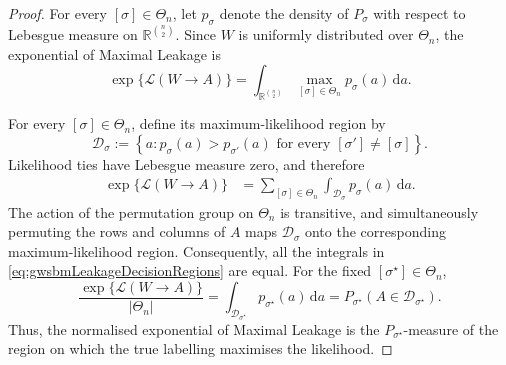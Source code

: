 \documentclass[11pt]{article}
\theoremstyle{definition}
\theoremstyle{remark}
\newcommand{\1}{\boldsymbol{1}}
\newcommand{\ml}[2]{\mathcal{L}(#1\!\to\!#2)}
\begin{document}
\begin{proof}
For every $[\sigma]\in\Theta_n$, let $p_\sigma$ denote the density of
$P_\sigma$ with respect to Lebesgue measure on
$\mathbb R^{\binom{n}{2}}$. Since $W$ is uniformly distributed over
$\Theta_n$, the exponential of Maximal Leakage is
\begin{equation}
\exp\{\ml{W}{A}\}
=
\int_{\mathbb R^{\binom{n}{2}}}
\max_{[\sigma]\in\Theta_n}
p_\sigma(a)
\,\mathrm da.
\label{eq:gwsbmLeakageIntegral}
\end{equation}

For every $[\sigma]\in\Theta_n$, define its maximum-likelihood region by
\begin{equation}
\mathcal D_\sigma
:=
\left\{
a:
p_\sigma(a)>
p_{\sigma'}(a)
\text{ for every }
[\sigma']\neq[\sigma]
\right\}.
\label{eq:gwsbmMLRegion}
\end{equation}
Likelihood ties have Lebesgue measure zero, and therefore
\begin{align}
\exp\{\ml{W}{A}\}
&=
\sum_{[\sigma]\in\Theta_n}
\int_{\mathcal D_\sigma}
p_\sigma(a)
\,\mathrm da.
\label{eq:gwsbmLeakageDecisionRegions}
\end{align}
The action of the permutation group on $\Theta_n$ is transitive, and
simultaneously permuting the rows and columns of $A$ maps
$\mathcal D_\sigma$ onto the corresponding maximum-likelihood region.
Consequently, all the integrals in
\eqref{eq:gwsbmLeakageDecisionRegions} are equal. For the fixed
$[\sigma^\star]\in\Theta_n$,
\begin{equation}
\frac{\exp\{\ml{W}{A}\}}{|\Theta_n|}
=
\int_{\mathcal D_{\sigma^\star}}
p_{\sigma^\star}(a)
\,\mathrm da
=
P_{\sigma^\star}
\left(
A\in\mathcal D_{\sigma^\star}
\right).
\label{eq:gwsbmNormalisedLeakageRegion}
\end{equation}
Thus, the normalised exponential of Maximal Leakage is the
$P_{\sigma^\star}$-measure of the region on which the true labelling
maximises the likelihood.


\end{proof}
\end{document}
